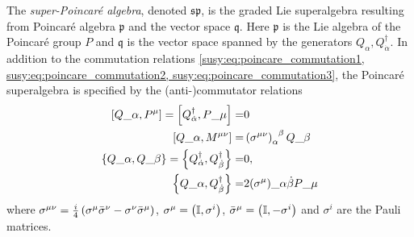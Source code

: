 \documentclass[../main.tex]{subfiles}
\begin{document}
The \emph{super-Poincaré algebra}, denoted \(\mathfrak{sp}\), is the graded Lie superalgebra resulting from Poincaré algebra \(\mathfrak{p}\) and the vector space \(\mathfrak{q}\).
Here \(\mathfrak{p}\) is the Lie algebra of the Poincaré group \(P\) and \(\mathfrak{q}\) is the vector space spanned by the generators \(Q_\alpha, Q^\dagger_{\dot\alpha}\).
In addition to the commutation relations \cref{susy:eq:poincare_commutation1, susy:eq:poincare_commutation2, susy:eq:poincare_commutation3}, the Poincaré superalgebra is specified by the (anti-)commutator relations
\begin{subequations}
  \begin{align}
    \commutator{Q\_\alpha}{P\^\mu} = \commutator{Q\indices*{^\dagger_{\dot\alpha}}}{P\_\mu} =               & 0                                                          \\
    \commutator{Q\_\alpha}{M\^{\mu\nu}} =                                                                   & \pclosed{\sigma\^{\mu\nu}}\indices{_\alpha^\beta} Q\_\beta \\
    \anticommutator{Q\_\alpha}{Q\_\beta} = \anticommutator{Q^\dagger_{\dot\alpha}}{Q^\dagger_{\dot\beta}} = & 0,                                                         \\
    \anticommutator{Q\_\alpha}{Q^\dagger_{\dot\beta}} =                                                     & 2(\sigma^\mu)\_{\alpha \dot\beta} P\_\mu
  \end{align}
\end{subequations}
where \(\sigma\^{\mu\nu} = \frac{i}{4}\pclosed{\sigma\^\mu \bar{\sigma}\^\nu - \sigma\^\nu \bar{\sigma}\^\mu}\), \(\sigma^\mu = \left(\operatorname{\mathbb{I}}, \sigma^i\right)\), \(\bar\sigma^\mu = \left(\operatorname{\mathbb{I}}, -\sigma^i\right)\) and \(\sigma^i\) are the Pauli matrices.
\end{document}
